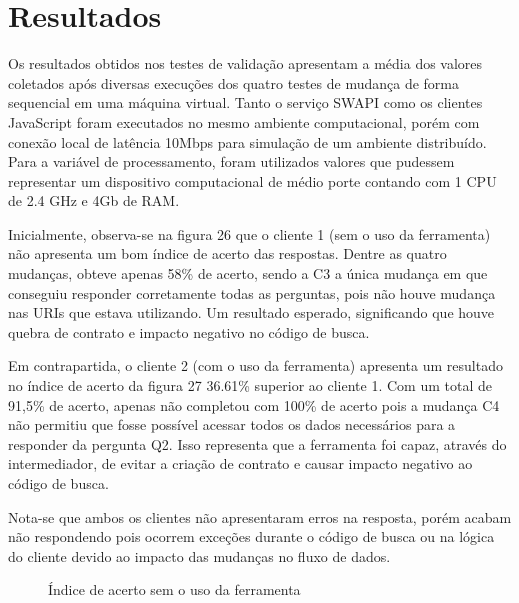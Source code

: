 \section{Resultados}

Os resultados obtidos nos testes de validação apresentam a média dos valores coletados após diversas execuções dos quatro testes de mudança de forma sequencial em uma máquina virtual. Tanto o serviço SWAPI como os clientes JavaScript foram executados no mesmo ambiente computacional, porém com conexão local de latência 10Mbps para simulação de um ambiente distribuído. Para a variável de processamento, foram utilizados valores que pudessem representar um dispositivo computacional de médio porte contando com 1 CPU de 2.4 GHz e 4Gb de RAM.

Inicialmente, observa-se na figura 26 que o cliente 1 (sem o uso da ferramenta) não apresenta um bom índice de acerto das respostas. Dentre as quatro mudanças, obteve apenas 58\% de acerto, sendo a C3 a única mudança em que conseguiu responder corretamente todas as perguntas, pois não houve mudança nas URIs que estava utilizando. Um resultado esperado, significando que houve quebra de contrato e impacto negativo no código de busca.

Em contrapartida, o cliente 2 (com o uso da ferramenta) apresenta um resultado no índice de acerto da figura 27 36.61\% superior ao cliente 1. Com um total de 91,5\% de acerto, apenas não completou com 100\% de acerto pois a mudança C4 não permitiu que fosse possível acessar todos os dados necessários para a responder da pergunta Q2. Isso representa que a ferramenta foi capaz, através do intermediador, de evitar a criação de contrato e causar impacto negativo ao código de busca.

Nota-se que ambos os clientes não apresentaram erros na resposta, porém acabam não respondendo pois ocorrem exceções durante o código de busca ou na lógica do cliente devido ao impacto das mudanças no fluxo de dados.

\begin{figure}[H]
  \centering
  \caption{Índice de acerto sem o uso da ferramenta}
\end{figure}

